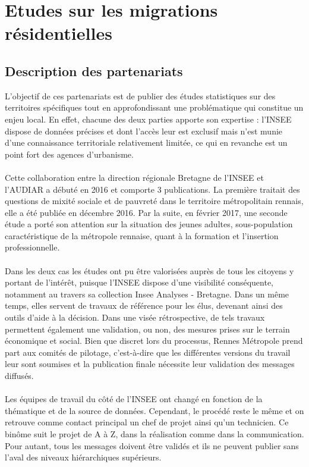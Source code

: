 \documentclass{bredele}
\begin{document}
\chapter[Etudes sur les migrations résidentielles]{Etudes sur les migrations résidentielles}

\section{Description des partenariats}
L’objectif de ces partenariats est de publier des études statistiques sur des territoires spécifiques tout en approfondissant une problématique qui constitue un enjeu local. En effet, chacune des deux parties apporte son expertise : l’INSEE dispose de données précises et dont l’accès leur est exclusif mais n’est munie d’une connaissance territoriale relativement limitée, ce qui en revanche est un point fort des agences d’urbanisme.
\\\\
Cette collaboration entre la direction régionale Bretagne de l’INSEE et l’AUDIAR a débuté en 2016 et comporte 3 publications. La première traitait des questions de mixité sociale et de pauvreté dans le territoire métropolitain rennais, elle a été publiée en décembre 2016. Par la suite, en février 2017, une seconde étude a porté son attention sur la situation des jeunes adultes, sous-population caractéristique de la métropole rennaise, quant à la formation et l’insertion professionnelle.
\\\\
Dans les deux cas les études ont pu être valorisées auprès de tous les citoyens y portant de l’intérêt, puisque l’INSEE dispose d’une visibilité conséquente, notamment au travers sa collection Insee Analyses - Bretagne. Dans un même temps, elles servent de travaux de référence pour les élus, devenant ainsi des outils d’aide à la décision. Dans une visée rétrospective, de tels travaux permettent également une validation, ou non, des mesures prises sur le terrain économique et social. Bien que discret lors du processus, Rennes Métropole prend part aux comités de pilotage, c’est-à-dire que les différentes versions du travail leur sont soumises et la publication finale nécessite leur validation des messages diffusés.
\\\\
Les équipes de travail du côté de l’INSEE ont changé en fonction de la thématique et de la source de données. Cependant, le procédé reste le même et on retrouve comme contact principal un chef de projet ainsi qu’un technicien. Ce binôme suit le projet de A à Z, dans la réalisation comme dans la communication. Pour autant, tous les messages doivent être validés et ils ne peuvent publier sans l’aval des niveaux hiérarchiques supérieurs.
\end{document}
